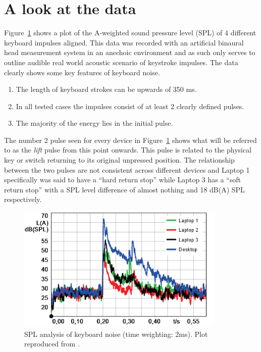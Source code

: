 \section{A look at the data}
Figure~\ref{fig:TypingSPLKeyboards} shows a plot of the A-weighted sound pressure level (SPL) of 4 different keyboard impulses aligned\cite{Hauswirth2013}. This data was recorded with an artificial binaural head measurement system in an anechoic environment and as such only serves to outline audible real world acoustic scenario of keystroke impulses. The data clearly shows some key features of keyboard noise.
\begin{enumerate}
\item The length of keyboard strokes can be upwards of 350 ms.
\item In all tested cases the impulses consist of at least 2 clearly defined pulses.
\item The majority of the energy lies in the initial pulse.
\end{enumerate}

The number 2 pulse seen for every device in Figure~\ref{fig:TypingSPLKeyboards} shows what will be referred to as the \emph{lift} pulse from this point onwards. This pulse is related to the physical key or switch returning to its original unpressed position. The relationship between the two pulses are not consistent across different devices and Laptop 1 specifically was said to have a ``hard return stop'' while Laptop 3 has a ``soft return stop'' with a SPL level difference of almost nothing and 18 dB(A) SPL respectively.

\begin{figure}[!] %
\centering
\includegraphics[width=100mm]{TypingSPLKeyboards.png}
\caption{SPL analysis of keyboard noise (time weighting: 2ms). Plot reproduced from \cite{Hauswirth2013}.}\label{fig:TypingSPLKeyboards}
\end{figure}

